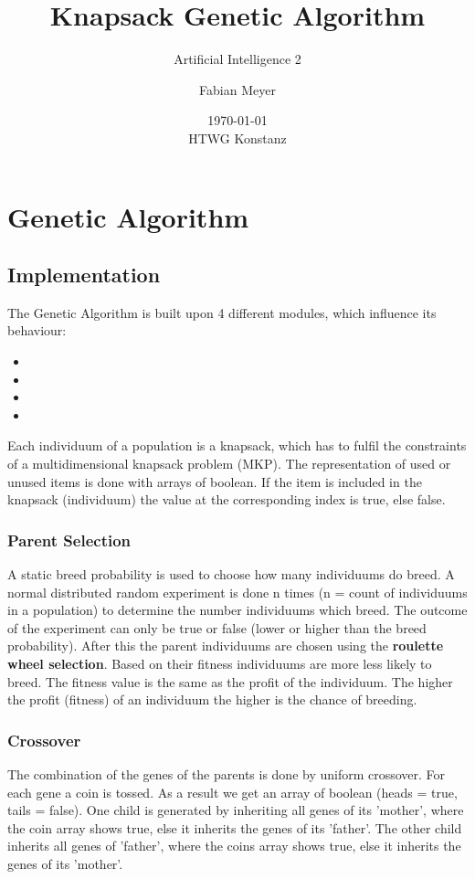 \documentclass[fontsize=12pt,toc=bibliography, notitlepage]{scrreprt}
\title{Knapsack Genetic Algorithm}
\subtitle{Artificial Intelligence 2}
\author{Fabian Meyer}
\date{\today \\ HTWG Konstanz}
\begin{document}
\maketitle
\tableofcontents

\chapter{Genetic Algorithm}
\label{chap:genetic-algorithm}

\section{Implementation}
\label{sec:implementation}

The Genetic Algorithm is built upon 4 different modules, which influence its behaviour:
\begin{itemize}
	\item {}
	\item {}
	\item {}
	\item {}
\end{itemize}
Each individuum of a population is a knapsack, which has to fulfil the constraints of a multidimensional knapsack problem (MKP).
The representation of used or unused items is done with arrays of boolean. If the item is included in the knapsack (individuum) the value at the corresponding index is true, else false.

\subsection{Parent Selection}
\label{subsec:parent-selection}
A static breed probability is used to choose how many individuums do breed. A normal distributed random experiment is done n times (n = count of individuums in a population) to determine the number individuums which breed. The outcome of the experiment can only be true or false (lower or higher than the breed probability).
After this the parent individuums are chosen using the \textbf{roulette wheel selection}. Based on their fitness individuums are more less likely to breed. The fitness value is the same as the profit of the individuum. The higher the profit (fitness) of an individuum the higher is the chance of breeding.\\

\subsection{Crossover}
\label{subsec:crossover}
The combination of the genes of the parents is done by uniform crossover. For each gene a coin is tossed. As a result we get an array of boolean (heads = true, tails = false). One child is generated by inheriting all genes of its 'mother', where the coin array shows true, else it inherits the genes of its 'father'. The other child inherits all genes of 'father', where the coins array shows true, else it inherits the genes of its 'mother'.
\end{document}
